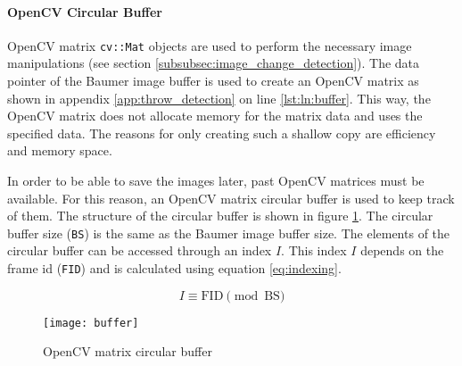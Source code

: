 \paragraph{OpenCV Circular Buffer}
OpenCV matrix \texttt{cv::Mat} objects are used to perform the necessary image manipulations (see section \ref{subsubsec:image_change_detection}).
The data pointer of the Baumer image buffer is used to create an OpenCV matrix as shown in appendix \ref{app:throw_detection} on line \ref{lst:ln:buffer}.
This way, the OpenCV matrix does not allocate memory for the matrix data and uses the specified data.
The reasons for only creating such a shallow copy are efficiency and memory space.

In order to be able to save the images later, past OpenCV matrices must be available.
For this reason, an OpenCV matrix circular buffer is used to keep track of them.
The structure of the circular buffer is shown in figure \ref{fig:circular_buffer}.
The circular buffer size (\texttt{BS}) is the same as the Baumer image buffer size.
The elements of the circular buffer can be accessed through an index $I$.
This index $I$ depends on the frame id (\texttt{FID}) and is calculated using equation \ref{eq:indexing}.

\begin{equation}
  I \equiv \text{FID} \pmod{\text{BS}}
  \label{eq:indexing}
\end{equation}

\begin{figure}[hb]
  \centering
  \texttt{[image: buffer]}
  \caption{OpenCV matrix circular buffer}
  \label{fig:circular_buffer}
\end{figure}
